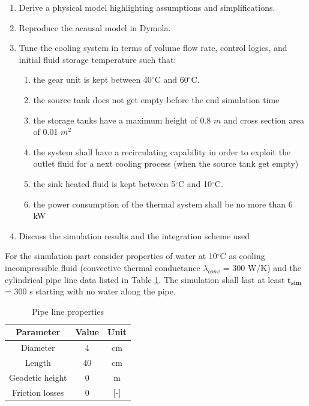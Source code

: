 \documentclass[11pt,a4paper,oneside]{article}
\begin{document}
\begin{enumerate}
    \item Derive a physical model highlighting assumptions and simplifications.

    \item Reproduce the acausal model in Dymola.

    \item Tune the cooling system in terms of volume flow rate, control logics, and initial fluid storage temperature such that:
    \begin{enumerate}
    
        \item the gear unit is kept between 40$^{\circ}$C and 60$^{\circ}$C.
        
        \item the source tank does not get empty before the end simulation time

        \item the storage tanks have a maximum height of 0.8 $m$ and cross section area of 0.01 $m^2$
        
        \item the system shall have a recirculating capability in order to exploit the outlet fluid for a next cooling process (when the source tank get empty)
        
        \item the sink heated fluid is kept between 5$^{\circ}$C and 10$^{\circ}$C.

        \item the power consumption of the thermal system shall be no more than 6 kW 
        
    \end{enumerate}

    \item Discuss the simulation results and the integration scheme used
     
    
\end{enumerate}

\noindent For the simulation part consider properties of water at 10$^{\circ}$C as cooling incompressible fluid (convective thermal conductance $\lambda_{conv}$ = 300 W/K) and the cylindrical pipe line data listed in Table \ref{tab:pipe}. The simulation shall last at least $\mathbf{t_{sim}}$ = 300 s starting with no water along the pipe.


\begin{table}[h!]
    \centering
    \caption{Pipe line properties}
\begin{tabular}{ |c|c|c| } 
\hline
\textbf{Parameter} & \textbf{Value} & \textbf{Unit}\\
\hline
Diameter & 4 & cm  \\ 
Length & 40 & cm  \\ 
Geodetic height & 0 & m \\
Friction losses & 0 & [-] \\ 
\hline
\end{tabular}
\label{tab:pipe}
    \end{table}
\end{document}
